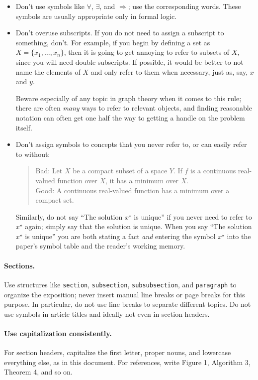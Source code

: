 \documentclass[12pt]{article}
\begin{document}
\begin{itemize}
\item Don't use symbols like $\forall$, $\exists$, and $\Rightarrow$; use the
corresponding words. These symbols are usually appropriate only in
formal logic. 

\item Don't overuse subscripts. If you do not need to assign a subscript
to something, don't. For example, if you begin by defining a set as
$X = \{x_1, \dots, x_n\}$, then it is going to get annoying to refer to subsets
of $X$, since you will need double subscripts. If possible, it would be better
to not name the elements of $X$ and only refer to them when necessary, just
as, say, $x$ and $y$. 

Beware especially of any topic in graph theory when it comes to this rule;
there are often \emph{many} ways to refer to relevant objects, and finding
reasonable notation can often get one half the way to getting a handle on the
problem itself.

\item Don't assign symbols to concepts that you never refer to, or can easily
refer to without:
\begin{quote}
Bad: Let $X$ be a compact subset of a space $Y$. If $f$ is a continuous
real-valued function over $X$, it has a minimum over $X$. \\
Good: A continuous real-valued function has a minimum over a compact set.
\end{quote}
Similarly, do not say ``The solution $x^\star$ is unique'' if you never need
to refer to $x^\star$ again; simply say that the solution is unique.
When you say ``The solution $x^\star$ is unique'' you are both stating a fact
\emph{and} entering the symbol $x^\star$ into the paper's symbol table and
the reader's working memory.
\end{itemize}

\paragraph{Sections.}
Use structures like \texttt{section}, \texttt{subsection},
\texttt{subsubsection}, and \texttt{paragraph} to organize the exposition;
never insert manual line breaks or page breaks for this purpose. In particular,
do not use line breaks to separate different topics. Do not use symbols in
article titles and ideally not even in section headers.

\paragraph{Use capitalization consistently.}
For section headers, capitalize the first letter, proper nouns, and lowercase
everything else, as in this document.  For references, write Figure 1, Algorithm 3,
Theorem 4, and so on.
\end{document}
